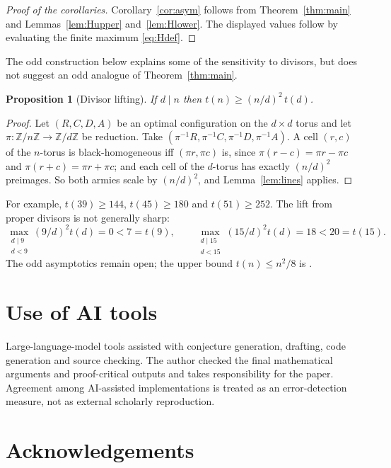 \documentclass[11pt]{amsart}
\newtheorem{proposition}[theorem]{Proposition}
\theoremstyle{definition}
\theoremstyle{remark}
\newcommand{\Z}{\mathbb{Z}}
\newcommand{\Zn}{\Z/n\Z}
\begin{document}
\begin{proof}[Proof of the corollaries]
Corollary~\ref{cor:asym} follows from Theorem~\ref{thm:main} and
Lemmas~\ref{lem:Hupper} and~\ref{lem:Hlower}.  The displayed values follow
by evaluating the finite maximum \eqref{eq:Hdef}.
\end{proof}

The odd construction below explains some of the sensitivity to divisors, but
does not suggest an odd analogue of Theorem~\ref{thm:main}.

\begin{proposition}[Divisor lifting]\label{prop:lift}
If $d\mid n$ then $t(n)\ge(n/d)^2\,t(d)$.
\end{proposition}

\begin{proof}
Let $(R,C,D,A)$ be an optimal configuration on the $d\times d$ torus and let $\pi:\Zn\to\Z/d\Z$ be reduction. Take $(\pi^{-1}R,\pi^{-1}C,\pi^{-1}D,\pi^{-1}A)$. A cell $(r,c)$ of the $n$-torus is black-homogeneous iff $(\pi r,\pi c)$ is, since $\pi(r-c)=\pi r-\pi c$ and $\pi(r+c)=\pi r+\pi c$; and each cell of the $d$-torus has exactly $(n/d)^2$ preimages. So both armies scale by $(n/d)^2$, and Lemma~\ref{lem:lines} applies.
\end{proof}

For example, $t(39)\ge144$, $t(45)\ge180$ and $t(51)\ge252$.  The lift from
proper divisors is not generally sharp:
\[
\max_{\substack{d\mid9\\d<9}}(9/d)^2t(d)=0<7=t(9),\qquad
\max_{\substack{d\mid15\\d<15}}(15/d)^2t(d)=18<20=t(15).
\]
The odd asymptotics remain open; the upper bound $t(n)\le n^2/8$ is
\cite[Thm.~1.4]{CDHS24}.

\section{Use of AI tools}\label{sec:ai}

Large-language-model tools assisted with conjecture generation, drafting,
code generation and source checking.  The author checked the final mathematical
arguments and proof-critical outputs and takes responsibility for the paper.
Agreement among AI-assisted implementations is treated as an error-detection
measure, not as external scholarly reproduction.

\section*{Acknowledgements}
\end{document}
